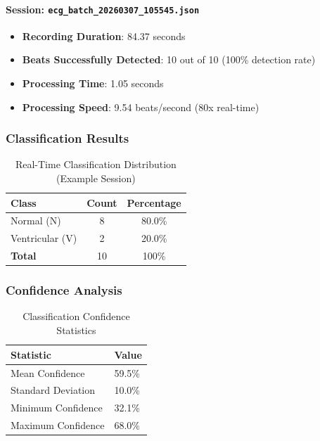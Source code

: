 \documentclass[12pt,a4paper]{article}
\begin{document}
\paragraph{Session: \texttt{ecg\_batch\_20260307\_105545.json}}

\begin{itemize}
    \item \textbf{Recording Duration}: 84.37 seconds
    \item \textbf{Beats Successfully Detected}: 10 out of 10 (100\% detection rate)
    \item \textbf{Processing Time}: 1.05 seconds
    \item \textbf{Processing Speed}: 9.54 beats/second (80x real-time)
\end{itemize}

\subsubsection{Classification Results}

\begin{table}[H]
\centering
\begin{tabular}{@{}lcc@{}}
\toprule
\textbf{Class} & \textbf{Count} & \textbf{Percentage} \\ 
\midrule
Normal (N) & 8 & 80.0\% \\
Ventricular (V) & 2 & 20.0\% \\
\midrule
\textbf{Total} & 10 & 100\% \\
\bottomrule
\end{tabular}
\caption{Real-Time Classification Distribution (Example Session)}
\label{tab:realtime_classification}
\end{table}

\subsubsection{Confidence Analysis}

\begin{table}[H]
\centering
\begin{tabular}{@{}ll@{}}
\toprule
\textbf{Statistic} & \textbf{Value} \\ 
\midrule
Mean Confidence & 59.5\% \\
Standard Deviation & 10.0\% \\
Minimum Confidence & 32.1\% \\
Maximum Confidence & 68.0\% \\
\bottomrule
\end{tabular}
\caption{Classification Confidence Statistics}
\label{tab:confidence_stats}
\end{table}
\end{document}
